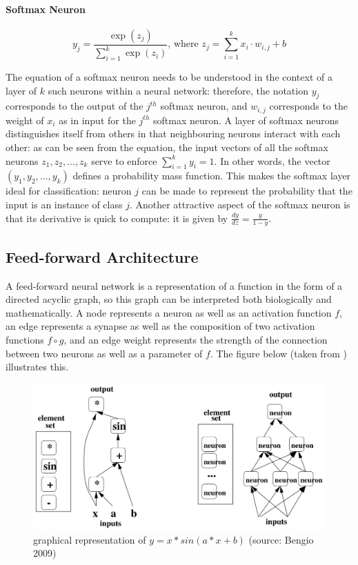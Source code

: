 \documentclass[a4paper,11pt]{article}
\begin{document}
\paragraph{Softmax Neuron}
\begin{equation}
\label{}
y_{j} = \frac{\exp(z_{j})}{\sum\limits_{i=1}^k\exp(z_{i})} \text{, where } z_{j} = \sum\limits_{i=1}^k x_{i}\cdot w_{i,j} + b
\end{equation}

The equation of a softmax neuron needs to be understood in the context of a layer of $k$ such neurons within a neural network: therefore, the notation $y_{j}$ corresponds to the output of the $j^{th}$ softmax neuron, and $w_{i,j}$ corresponds to the weight of $x_{i}$ as in input for the $j^{th}$ softmax neuron. A layer of softmax neurons distinguishes itself from others in that neighbouring neurons interact with each other: as can be seen from the equation, the input vectors of all the softmax neurons $z_{1}, z_{2}, ..., z_{k}$ serve to enforce $\sum\limits_{i=1}^k y_{i} = 1$. In other words, the vector $(y_{1}, y_{2}, ..., y_{k})$ defines a probability mass function. This makes the softmax layer ideal for classification: neuron $j$ can be made to represent the probability that the input is an instance of class $j$. Another attractive aspect of the softmax neuron is that its derivative is quick to compute: it is given by $\frac{dy}{dz} = \frac{y}{1-y}$. \\


\subsection{Feed-forward Architecture}

A feed-forward neural network is a representation of a function in the form of a directed acyclic graph, so this graph can be interpreted both biologically and mathematically. A node represents a neuron as well as an activation function $f$, an edge represents a synapse as well as the composition of two activation functions $f \circ g$, and an edge weight represents the strength of the connection between two neurons as well as a parameter of $f$. The figure below (taken from \cite{DL-book}) illustrates this.

\begin{figure}[h!]
	\centering
	\includegraphics[scale=0.3]{images/NN_math_rep.png}
	\caption{graphical representation of $y = x*sin(a*x+b)$ (source: Bengio 2009)}
\end{figure}
\end{document}
